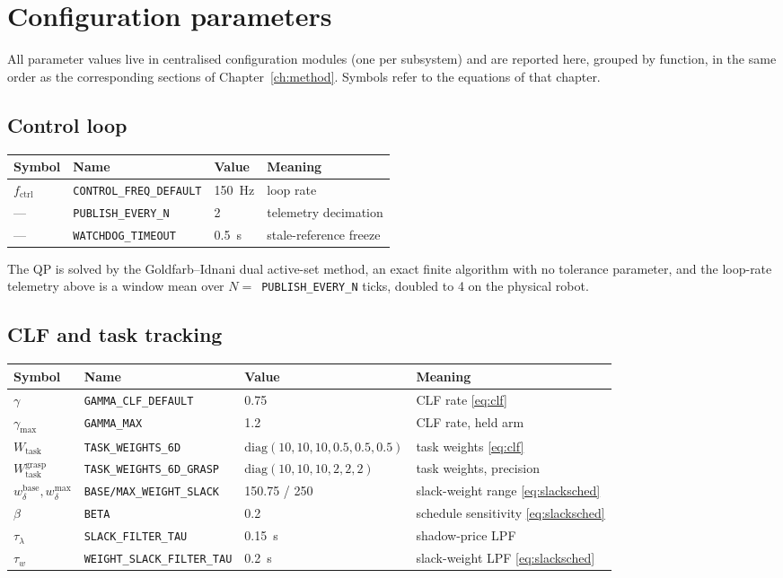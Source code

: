 \documentclass[12pt,a4paper,twoside,openright]{report}
\begin{document}
\appendix
\chapter{Configuration parameters}
\label{app:config}


All parameter values live in centralised configuration modules (one per subsystem) and are reported here, grouped by function, in the same order as the corresponding sections of Chapter~\ref{ch:method}. Symbols refer to the equations of that chapter.

\begingroup\footnotesize

\section{Control loop}
\begin{tabularx}{\linewidth}{@{}lllX@{}}
\toprule
Symbol & Name & Value & Meaning \\
\midrule
$f_{\text{ctrl}}$ & \texttt{CONTROL\_FREQ\_DEFAULT} & 150~Hz & loop rate \\
--- & \texttt{PUBLISH\_EVERY\_N} & 2 & telemetry decimation \\
--- & \texttt{WATCHDOG\_TIMEOUT} & 0.5~s & stale-reference freeze \\
\bottomrule
\end{tabularx}

The QP is solved by the Goldfarb--Idnani dual active-set method, an exact finite algorithm with no tolerance parameter, and the loop-rate telemetry above is a window mean over $N = $~\texttt{PUBLISH\_EVERY\_N} ticks, doubled to 4 on the physical robot.

\section{CLF and task tracking}
\begin{tabularx}{\linewidth}{@{}lllX@{}}
\toprule
Symbol & Name & Value & Meaning \\
\midrule
$\gamma$ & \texttt{GAMMA\_CLF\_DEFAULT} & 0.75 & CLF rate \eqref{eq:clf} \\
$\gamma_{\max}$ & \texttt{GAMMA\_MAX} & 1.2 & CLF rate, held arm \\
$W_{\text{task}}$ & \texttt{TASK\_WEIGHTS\_6D} & $\mathrm{diag}(10,10,10,0.5,0.5,0.5)$ & task weights \eqref{eq:clf} \\
$W_{\text{task}}^{\text{grasp}}$ & \texttt{TASK\_WEIGHTS\_6D\_GRASP} & $\mathrm{diag}(10,10,10,2,2,2)$ & task weights, precision \\
$w_{\delta}^{\text{base}}, w_{\delta}^{\max}$ & \texttt{BASE/MAX\_WEIGHT\_SLACK} & 150.75 / 250 & slack-weight range \eqref{eq:slacksched} \\
$\beta$ & \texttt{BETA} & 0.2 & schedule sensitivity \eqref{eq:slacksched} \\
$\tau_{\lambda}$ & \texttt{SLACK\_FILTER\_TAU} & 0.15~s & shadow-price LPF \\
$\tau_{w}$ & \texttt{WEIGHT\_SLACK\_FILTER\_TAU} & 0.2~s & slack-weight LPF \eqref{eq:slacksched} \\
\bottomrule
\end{tabularx}
\end{document}
